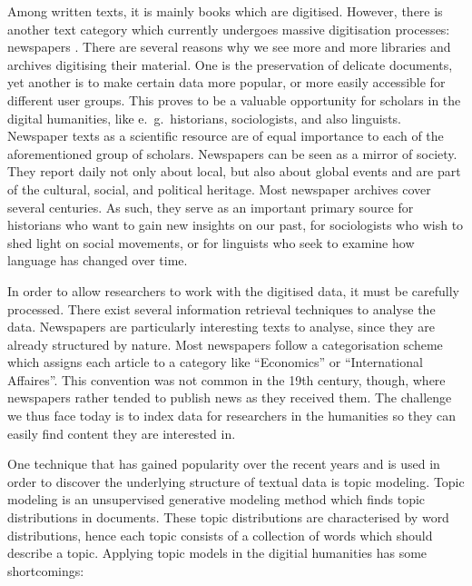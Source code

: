 Among written texts, it is mainly books which are digitised. However, there is another text category which currently undergoes massive digitisation processes: newspapers \citep{lansdall-welfarecontent2017,prestondigital2016,binghamdigitization2010}. There are several reasons why we see more and more libraries and archives digitising their material. One is the preservation of delicate documents, yet another is to make certain data more popular, or more easily accessible for different user groups. This proves to be a valuable opportunity for scholars in the digital humanities, like e.~g.~historians, sociologists, and also linguists. Newspaper texts as a scientific resource are of equal importance to each of the aforementioned group of scholars. Newspapers can be seen as a mirror of society. They report daily not only about local, but also about global events and are part of the cultural, social, and political heritage. Most newspaper archives cover several centuries. As such, they serve as an important primary source for historians who want to gain new insights on our past, for sociologists who wish to shed light on social movements, or for linguists who seek to examine how language has changed over time.

In order to allow researchers to work with the digitised data, it must be carefully processed. There exist several information retrieval techniques to analyse the data. Newspapers are particularly interesting texts to analyse, since they are already structured by nature. Most newspapers follow a categorisation scheme which assigns each article to a category like ``Economics'' or ``International Affaires''. This convention was not common in the 19th century, though, where newspapers rather tended to publish news as they received them. The challenge we thus face today is to index data for researchers in the humanities so they can easily find content they are interested in. 

One technique that has gained popularity over the recent years and is used in order to discover the underlying structure of textual data is topic modeling. Topic modeling is an unsupervised generative modeling method which finds topic distributions in documents. These topic distributions are characterised by word distributions, hence each topic consists of a collection of words which should describe a topic. Applying topic models in the digitial humanities has some shortcomings: 


